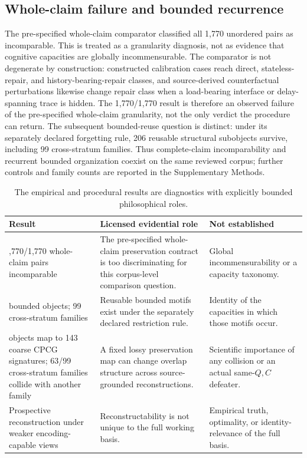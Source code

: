 \documentclass[11pt]{article}
\begin{document}
\subsection{Whole-claim failure and bounded recurrence}
\label{sec:wholefail}

The pre-specified whole-claim comparator classified all 1,770 unordered pairs as incomparable. This is treated as a granularity diagnosis, not as evidence that cognitive capacities are globally incommensurable. The comparator is not degenerate by construction: constructed calibration cases reach direct, stateless-repair, and history-bearing-repair classes, and source-derived counterfactual perturbations likewise change repair class when a load-bearing interface or delay-spanning trace is hidden. The 1,770/1,770 result is therefore an observed failure of the pre-specified whole-claim granularity, not the only verdict the procedure can return. The subsequent bounded-reuse question is distinct: under its separately declared forgetting rule, 206 reusable structural subobjects survive, including 99 cross-stratum families. Thus complete-claim incomparability and recurrent bounded organization coexist on the same reviewed corpus; further controls and family counts are reported in the Supplementary Methods.

\begin{table}[t]
\centering
\small
\begin{tabularx}{\textwidth}{>{\raggedright\arraybackslash}p{} X X}
\toprule
Result & Licensed evidential role & Not established \\
\midrule
1,770/1,770 whole-claim pairs incomparable & The pre-specified whole-claim preservation contract is too discriminating for this corpus-level comparison question. & Global incommensurability or a capacity taxonomy. \\
206 bounded objects; 99 cross-stratum families & Reusable bounded motifs exist under the separately declared restriction rule. & Identity of the capacities in which those motifs occur. \\
206 objects map to 143 coarse CPCG signatures; 63/99 cross-stratum families collide with another family & A fixed lossy preservation map can change overlap structure across source-grounded reconstructions. & Scientific importance of any collision or an actual same-\(Q,C\) defeater. \\
Prospective reconstruction under weaker encoding-capable views & Reconstructability is not unique to the full working basis. & Empirical truth, optimality, or identity-relevance of the full basis. \\
\bottomrule
\end{tabularx}
\caption{The empirical and procedural results are diagnostics with explicitly bounded philosophical roles.}
\label{tab:evidential-roles}
\end{table}
\end{document}
